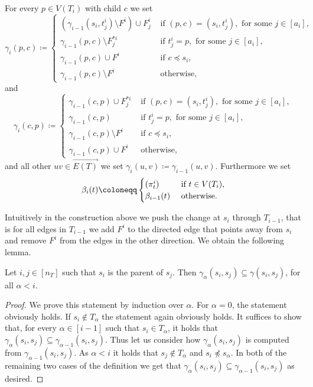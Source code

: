 \documentclass{lmcs}
\theoremstyle{plain}\newtheorem{claim}[thm]{Claim}   %
\let\boundary\relax
\newcommand{\boundary}{\Delta}
\begin{document}
For every $p\in V(T_i)$ with child $c$ we set
\begin{equation*}
	\gamma_i(p,c)\coloneqq\begin{cases}
		\left(\gamma_{i-1}(s_i,t^i_j)\setminus F^i\right)\cup F^i_j & \text{ if } (p,c)=(s_i,t^i_j), \text{ for some } j\in[a_i],\\
		\gamma_{i-1}(p,c)\setminus F^{*i}_j & \text{ if } t^i_j= p, \text{ for some } j\in[a_i],\\
		\gamma_{i-1}(p,c)\cup F^i & \text{ if } c\preceq s_i,\\
		\gamma_{i-1}(p,c)\setminus F^i & \text{ otherwise,}
	\end{cases}
\end{equation*}
and
\begin{equation*}
	\gamma_i(c,p)\coloneqq\begin{cases}
		\gamma_{i-1}(c,p) \cup F^{*i}_j & \text{ if } (p,c)=(s_i,t^i_j), \text{ for some } j\in[a_i],\\
		\gamma_{i-1}(c,p) & \text{ if } t^i_j= p, \text{ for some } j\in[a_i],\\
		\gamma_{i-1}(c,p) \setminus F^i & \text{ if } c\preceq s_i,\\
		\gamma_{i-1}(c,p) \cup F^i & \text{ otherwise,}
	\end{cases}
\end{equation*}
and all other $uv\in\overrightarrow{E(T)}$ we set $\gamma_i(u,v)\coloneqq\gamma_{i-1}(u,v)$.
Furthermore we set
\begin{equation*}
	\beta_i(t)\coloneqq\begin{cases}
		\boundary(\pi^i_t) & \text{ if } t\in V(T_i),\\
		\beta_{i-1}(t) & \text{ otherwise.}
	\end{cases}
\end{equation*}

Intuitively in the construction above we push the change at $s_i$ through $T_{i-1}$, that is for all edges in $T_{i-1}$ we add $F^i$ to the directed edge that points away from $s_i$ and remove $F^i$ from the edges in the other direction.
We obtain the following lemma.

\begin{lem}
	\label{obs:only-remove}
	Let $i,j\in[n_T]$ such that $s_i$ is the parent of $s_j$.
	Then $\gamma_{\alpha}(s_i,s_j) \subseteq \gamma(s_i,s_j)$, for all $\alpha<i$.
\end{lem}

\begin{proof}
	We prove this statement by induction over $\alpha$.
	For $\alpha = 0$, the statement obviously holds.
	If $s_i\notin T_{\alpha}$ the statement again obviously holds.
	It suffices to show that, for every $\alpha\in[i-1]$ such that $s_i\in T_{\alpha}$, it holds that $\gamma_{\alpha}(s_i,s_j) \subseteq \gamma_{\alpha-1}(s_i,s_j)$.
	Thus let us consider how $\gamma_{\alpha}(s_i,s_j)$ is computed from $\gamma_{\alpha - 1}(s_i,s_j)$.
	As $\alpha < i$ it holds that $s_j\notin T_{\alpha}$ and $s_i\not\preceq s_{\alpha}$.
	In both of the remaining two cases of the definition we get that $\gamma_{\alpha}(s_i,s_j) \subseteq \gamma_{\alpha-1}(s_i,s_j)$ as desired.
\end{proof}
\end{document}
